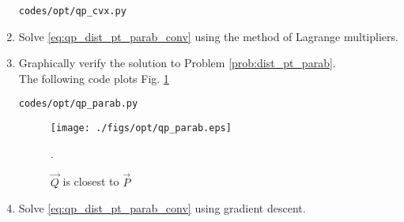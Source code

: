 \begin{enumerate}[label=\thesubsection.\arabic*.,ref=\thesubsection.\theenumi]
\begin{lstlisting}
codes/opt/qp_cvx.py
\end{lstlisting}

\item Solve \eqref{eq:qp_dist_pt_parab_conv} using the method of Lagrange multipliers.
\item Graphically verify the solution to Problem \ref{prob:dist_pt_parab}. 
\\
\solution 
The following code plots Fig. \ref{fig:qp_parab}
%	
\begin{lstlisting}
codes/opt/qp_parab.py
\end{lstlisting}

%
\begin{figure}[!ht]
\centering
\texttt{[image: ./figs/opt/qp\_parab.eps]}
\caption{ $\vec{Q}$ is closest to $\vec{P}$}.
\label{fig:qp_parab}
\end{figure}
%
%
%	
\item Solve \eqref{eq:qp_dist_pt_parab_conv} using gradient descent.
%
\end{enumerate}
